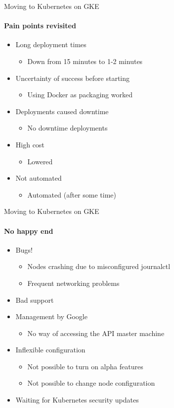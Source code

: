\documentclass[14pt]{beamer}
\begin{document}
  \begin{frame}{Moving to Kubernetes on GKE}
  \framesubtitle{Pain points revisited}
  \begin{itemize}
    \item Long deployment times
    \begin{itemize}
      \item Down from 15 minutes to 1-2 minutes
    \end{itemize}
    \item Uncertainty of success before starting
    \begin{itemize}
      \item Using Docker as packaging worked
    \end{itemize}
    \item Deployments caused downtime
    \begin{itemize}
      \item No downtime deployments
    \end{itemize}
    \item High cost
    \begin{itemize}
      \item Lowered
    \end{itemize}
    \item Not automated
    \begin{itemize}
      \item Automated (after some time)
    \end{itemize}
  \end{itemize}
  \end{frame}

  \begin{frame}{Moving to Kubernetes on GKE}
  \framesubtitle{No happy end}
  \begin{itemize}
    \item Bugs!
    \begin{itemize}
      \item Nodes crashing due to misconfigured journalctl
      \item Frequent networking problems
    \end{itemize}
    \item Bad support
    \item Management by Google
    \begin{itemize}
      \item No way of accessing the API master machine
    \end{itemize}
    \item Inflexible configuration
    \begin{itemize}
      \item Not possible to turn on alpha features
      \item Not possible to change node configuration
    \end{itemize}
  \item Waiting for Kubernetes security updates
  \end{itemize}
  \end{frame}
\end{document}
